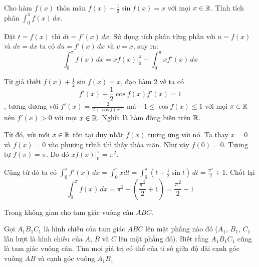 \begin{problem}{5}
    Cho hàm $f(x)$ thỏa mãn $f(x) + \frac{1}{2} \sin f(x) = x$ với mọi
    $x \in \mathbb{R}$. Tính tích phân $\int_{0}^{\pi} f(x)\,dx$.
\end{problem}

\begin{solution}
    Đặt $t = f(x)$ thì $dt = f'(x)\,dx$. Sử dụng tích phân từng
    phần với $u = f(x)$ và $dv = dx$ ta có $du = f'(x)\,dx$ và
    $v = x$, suy ra:
    \[\int_{0}^{\pi} f(x)\,dx = x f(x) \Big|^\pi_0 - \int_{0}^{\pi}x f'(x)\,dx\]

    Từ giả thiết $f(x) + \frac{1}{2} \sin f(x) = x$, đạo hàm 2 vế
    ta có 
    \[f'(x) + \frac{1}{2} \cos f(x) f'(x) = 1\]
    , tương đương với
    $f'(x) = \frac{2}{2 + \cos f(x)}$ mà $-1 \leq \cos f(x) \leq 1$
    với mọi $x \in \mathbb{R}$ nên $f'(x) > 0$ với mọi $x \in \mathbb{R}$. Nghĩa
    là hàm đồng biến trên $\mathbb{R}$.

    Từ đó, với mỗi $x \in \mathbb{R}$ tồn tại duy nhất $f(x)$ tương ứng
    với nó. Ta thay $x = 0$ và $f(x) = 0$ vào phương trình thì 
    thấy thỏa mãn. Như vậy $f(0) = 0$. Tương tự $f(\pi) = \pi$.
    Do đó $x f(x) \Big|^\pi_0 = \pi^2$.

    Cũng từ đó ta có $\int_{0}^{\pi} f'(x)\,dx = \int_{0}^{\pi} x dt
    = \int_{0}^{\pi} (t + \frac{1}{2} \sin t)\,dt = \frac{\pi^2}{2} + 1$.
    Chốt lại 
    \[\int_{0}^{\pi}f(x)\,dx = \pi^2 - (\frac{\pi^2}{2} + 1)
    = \frac{\pi^2}{2} - 1\]
\end{solution}

\begin{problem}{6}
    Trong không gian cho tam giác vuông cân $ABC$. 
    
    Gọi $A_1 B_1 C_1$ là hình chiếu của tam giác $ABC$ lên mặt phẳng nào đó ($A_1$, $B_1$, $C_1$
    lần lượt là hình chiếu của $A$, $B$ và $C$ lên mặt phẳng đó).
    Biết rằng $A_1 B_1 C_1$ cũng là tam giác vuông cân. Tìm mọi giá
    trị có thể của tỉ số giữa độ dài cạnh góc vuông $AB$ và cạnh
    góc vuông $A_1 B_1$
\end{problem}

